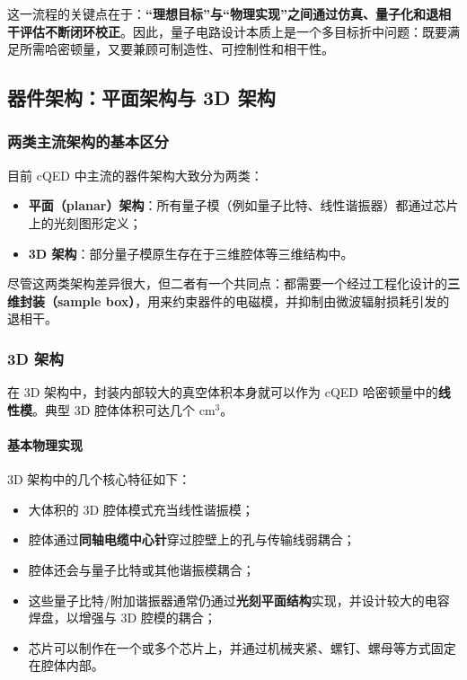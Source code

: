 \documentclass[12pt,a4paper,oneside]{ctexbook}
\begin{document}
这一流程的关键点在于：\textbf{“理想目标”与“物理实现”之间通过仿真、量子化和退相干评估不断闭环校正}。因此，量子电路设计本质上是一个多目标折中问题：既要满足所需哈密顿量，又要兼顾可制造性、可控制性和相干性。

\subsection{器件架构：平面架构与 3D 架构}

\subsubsection{两类主流架构的基本区分}

目前 cQED 中主流的器件架构大致分为两类：

\begin{itemize}
    \item \textbf{平面（planar）架构}：所有量子模（例如量子比特、线性谐振器）都通过芯片上的光刻图形定义；
    \item \textbf{3D 架构}：部分量子模原生存在于三维腔体等三维结构中。
\end{itemize}

尽管这两类架构差异很大，但二者有一个共同点：都需要一个经过工程化设计的\textbf{三维封装（sample box）}，用来约束器件的电磁模，并抑制由微波辐射损耗引发的退相干。

\subsubsection{3D 架构}

在 3D 架构中，封装内部较大的真空体积本身就可以作为 cQED 哈密顿量中的\textbf{线性模}。典型 3D 腔体体积可达几个 \(\mathrm{cm}^3\)。

\paragraph{基本物理实现}
3D 架构中的几个核心特征如下：
\begin{itemize}
    \item 大体积的 3D 腔体模式充当线性谐振模；
    \item 腔体通过\textbf{同轴电缆中心针}穿过腔壁上的孔与传输线弱耦合；
    \item 腔体还会与量子比特或其他谐振模耦合；
    \item 这些量子比特/附加谐振器通常仍通过\textbf{光刻平面结构}实现，并设计较大的电容焊盘，以增强与 3D 腔模的耦合；
    \item 芯片可以制作在一个或多个芯片上，并通过机械夹紧、螺钉、螺母等方式固定在腔体内部。
\end{itemize}
\end{document}
